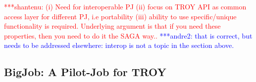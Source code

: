 \documentclass[conference,final]{IEEEtran}
\newcommand{\jhanote}[1]{ {\textcolor{red} { ***shantenu: #1 }}}
\newcommand{\alnote}[1]{ {\textcolor{blue} { ***andre: #1 }}}
\newcommand{\amnote}[1]{ {\textcolor{blue} { ***andre2: #1 }}}
\newcommand{\alnote}[1]{}
\newcommand{\amnote}[1]{}
\newcommand{\jhanote}[1]{}
\newcommand{\upp}{\vspace*{-0.5em}}
\begin{document}
\jhanote{(i) Need for interoperable PJ (ii) focus on TROY API as
  common access layer for different PJ, i.e portability (iii) ability
  to use specific/unique functionality is required. Underlying
  argument is that if you need these properties, then you need to do
  it the SAGA way..}
\amnote{that is correct, but needs to be addressed elsewhere: interop is
not a topic in the section above.}


\subsection{BigJob: A Pilot-Job for TROY\upp\upp}



\end{document}
